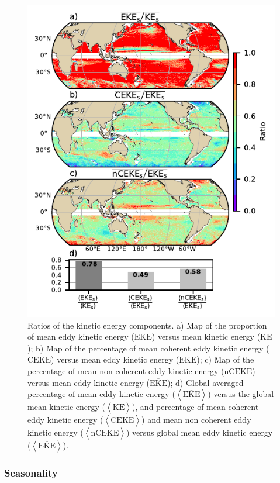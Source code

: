 \documentclass[draft,linenumbers]{agujournal2019}
\newcommand{\MKE}{\overline{\textrm{KE}}}
\newcommand{\MEKE}{\overline{\textrm{EKE}}}
\newcommand{\EKE}{\textrm{EKE}}
\newcommand{\MCEKE}{\overline{\textrm{CEKE}}}
\newcommand{\MnCEKE}{\overline{\textrm{nCEKE}}}
\begin{document}
	\begin{figure}
	    \centering
	    \includegraphics[width=1\textwidth]{figures/eke_ratio_map_easy.pdf}
	    \caption{Ratios of the kinetic energy components. a) Map of the proportion of mean eddy kinetic energy ($\EKE$) versus mean kinetic energy ($\MKE$);
		b) Map of the percentage of mean coherent eddy kinetic energy ($\MCEKE$) versus mean eddy kinetic energy ($\MEKE$);
		c) Map of the percentage of mean non-coherent eddy kinetic energy ($\MnCEKE$) versus mean eddy kinetic energy ($\MEKE$);
		d) Global averaged percentage of mean eddy kinetic energy ($\left<\MEKE\right>$) versus the global mean kinetic energy ($\left<\MKE\right>$), and percentage of mean coherent eddy kinetic energy ($\left<\MCEKE\right>$) and mean non coherent eddy kinetic energy ($\left<\MnCEKE\right>$) versus global mean eddy kinetic energy ($\left<\MEKE\right>$).
		}
	    \label{fig:eddy_ratio}
	\end{figure}

	\subsubsection{Seasonality}
\end{document}
